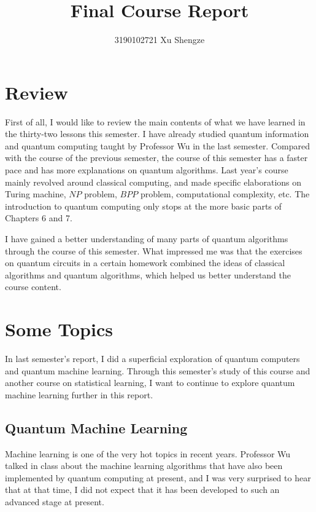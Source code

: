 \documentclass[11pt]{article}
\begin{document}
\title{{\bf Final Course Report}}
\author{3190102721 Xu Shengze}
\date{}
\maketitle

\section{Review}

\qquad First of all, I would like to review the main contents of what we have learned in the thirty-two lessons this semester. I have already studied quantum information and quantum computing taught by Professor Wu in the last semester. Compared with the course of the previous semester, the course of this semester has a faster pace and has more explanations on quantum algorithms. Last year's course mainly revolved around classical computing, and made specific elaborations on Turing machine, $NP$ problem, $BPP$ problem, computational complexity, etc. The introduction to quantum computing only stops at the more basic parts of Chapters 6 and 7.

I have gained a better understanding of many parts of quantum algorithms through the course of this semester. What impressed me was that the exercises on quantum circuits in a certain homework combined the ideas of classical algorithms and quantum algorithms, which helped us better understand the course content.


\section{Some Topics}
\qquad In last semester's report, I did a superficial exploration of quantum computers and quantum machine learning. Through this semester's study of this course and another course on statistical learning, I want to continue to explore quantum machine learning further in this report.

\subsection{Quantum Machine Learning}
\qquad Machine learning is one of the very hot topics in recent years. Professor Wu talked in class about the machine learning algorithms that have also been implemented by quantum computing at present, and I was very surprised to hear that at that time, I did not expect that it has been developed to such an advanced stage at present.
\end{document}

